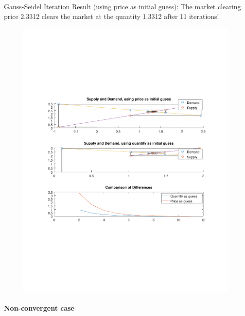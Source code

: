 \documentclass{article}
\begin{document}

Gauss-Seidel Iteration Result (using price as initial guess): The market clearing price 2.3312 clears the market at the quantity 1.3312 after 11 iterations!\\[2em]


\begin{figure}[h!]
\centering
    \includegraphics[width=0.99\textwidth]{figure1}
\end{figure}

\paragraph{Non-convergent case}
\end{document}
